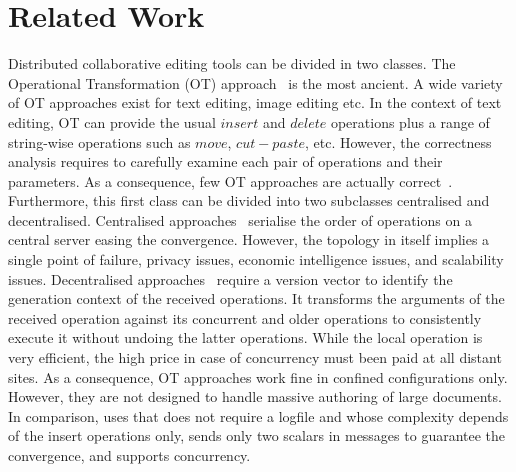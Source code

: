 \section{Related Work}
\label{sec:relatedwork}

Distributed collaborative editing tools can be divided in two classes. The
Operational Transformation (OT) approach~\cite{saito2005optimistic} is the most
ancient. A wide variety of OT approaches exist for text editing, image editing
etc. In the context of text editing, OT can provide the usual $insert$ and
$delete$ operations plus a range of string-wise operations such as $move$,
$cut-paste$, etc. However, the correctness analysis requires to carefully
examine each pair of operations and their parameters. As a consequence, few OT
approaches are actually correct~\cite{imine2003proving}. Furthermore, this
first class can be divided into two subclasses centralised and
decentralised. Centralised approaches~\cite{nichols1995high} serialise the
order of operations on a central server easing the convergence. However, the
topology in itself implies a single point of failure, privacy issues, economic
intelligence issues, and scalability issues. Decentralised
approaches~\cite{sun2009contextbased} require a version vector to identify the
generation context of the received operations. It transforms the arguments of
the received operation against its concurrent and older operations to
consistently execute it without undoing the latter operations. While the local
operation is very efficient, the high price in case of concurrency must been
paid at all distant sites.  As a consequence, OT approaches work fine in
confined configurations only. However, they are not designed to handle massive
authoring of large documents. In comparison, \CRATE uses \LSEQ that
does not require a logfile and whose complexity depends of the insert
operations only, sends only two scalars in messages to guarantee the
convergence, and supports concurrency.

